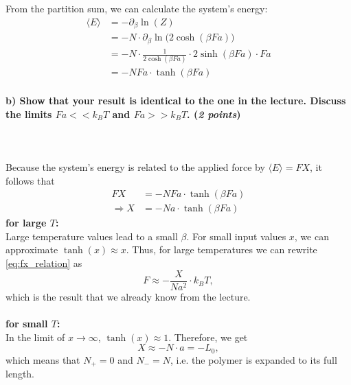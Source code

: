     \noindent
    From the partition sum, we can calculate the system's energy:
    \begin{align}
        \langle E\rangle
        &=-\partial_\beta \ln(Z) \\
        &=-N\cdot\partial_\beta\ln\bigg(2\cosh(\beta Fa)\bigg) \\
        &=-N\cdot\frac{1}{2\cosh(\beta Fa)}\cdot 2\sinh(\beta Fa)\cdot Fa \\
        &=-NFa\cdot\tanh(\beta Fa)
    \end{align}

\newpage
\paragraph{b) Show that your result is identical to the one in the lecture.
    Discuss the limits $Fa<<k_BT$ and $Fa>>k_BT$. (\textit{2 points})
} \ \\
    \\
    Because the system's energy is related to the applied force by 
    $\langle E\rangle=FX$, it follows that 
    \begin{align}
        FX
        &=-NFa\cdot\tanh(\beta Fa) \\
        \Rightarrow X
        &=-Na\cdot\tanh(\beta Fa)
        \label{eq:fx_relation}
    \end{align}
    \textbf{for large $T$:} \\
    Large temperature values lead to a small $\beta$.
    For small input values $x$, we can approximate $\tanh(x)\approx x$.
    Thus, for large temperatures we can rewrite \autoref{eq:fx_relation} as
    \begin{equation}
        F\approx-\frac{X}{Na^2}\cdot k_BT,
    \end{equation}
    which is the result that we already know from the lecture. \\
    \\
    \textbf{for small $T$:} \\
    In the limit of $x\to\infty$, $\tanh(x)\approx1$. Therefore, we get 
    \begin{equation}
        X\approx-N\cdot a=-L_0,
    \end{equation}
    which means that $N_+=0$ and $N_-=N$, i.e. the polymer is expanded to its 
    full length.

